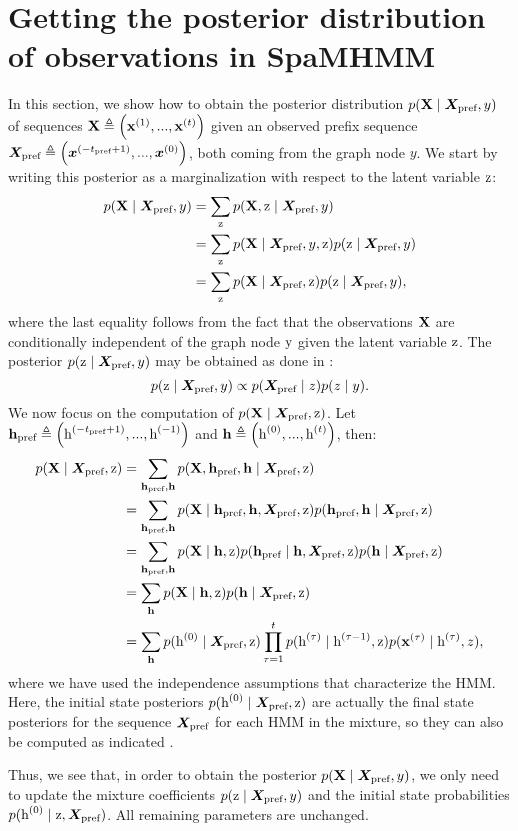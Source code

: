 \section{Getting the posterior distribution of observations in SpaMHMM}
\label{sec:posterior_proof}
In this section, we show how to obtain the posterior distribution $p({\mathbf{X}} \mid {\bm{X}}_\text{pref}, y)$ of sequences ${\mathbf{X}} \triangleq \left({\mathbf{x}}^{(1)}, ...,{\mathbf{x}}^{(t)}\right)$ given an observed prefix sequence ${\bm{X}}_\text{pref} \triangleq \left({\bm{x}}^{(-t_\text{pref}+1)}, ...,{\bm{x}}^{(0)}\right)$, both coming from the graph node $y$. We start by writing this posterior as a marginalization with respect to the latent variable ${\textnormal{z}}$:
\begin{align}
\label{mhmm_posterior}
p({\mathbf{X}} \mid {\bm{X}}_\text{pref}, y) &= \sum_{{\textnormal{z}}} p({\mathbf{X}}, {\textnormal{z}} \mid {\bm{X}}_\text{pref}, y)\nonumber\\
&= \sum_{{\textnormal{z}}} p({\mathbf{X}} \mid {\bm{X}}_\text{pref}, y, {\textnormal{z}}) p({\textnormal{z}} \mid {\bm{X}}_\text{pref}, y) \nonumber\\
&= \sum_{{\textnormal{z}}} p({\mathbf{X}} \mid {\bm{X}}_\text{pref}, {\textnormal{z}}) p({\textnormal{z}} \mid {\bm{X}}_\text{pref}, y),
\end{align}
where the last equality follows from the fact that the observations ${\mathbf{X}}$ are conditionally independent of the graph node ${\textnormal{y}}$ given the latent variable ${\textnormal{z}}$. The posterior $p({\textnormal{z}} \mid {\bm{X}}_\text{pref}, y)$ may be obtained as done in :
\begin{equation}
p({\textnormal{z}} \mid {\bm{X}}_\text{pref}, y) \propto p({\bm{X}}_\text{pref} \mid z)p(z \mid y).
\end{equation}
We now focus on the computation of $p({\mathbf{X}} \mid {\bm{X}}_\text{pref}, {\textnormal{z}})$. Let ${\mathbf{h}}_\text{pref} \triangleq \left({\textnormal{h}}^{(-t_\text{pref}+1)}, ...,{\textnormal{h}}^{(-1)}\right)$ and ${\mathbf{h}} \triangleq \left({\textnormal{h}}^{(0)}, ...,{\textnormal{h}}^{(t)}\right)$, then:
\begin{align}
p({\mathbf{X}} \mid {\bm{X}}_\text{pref}, {\textnormal{z}}) &= \sum_{{\mathbf{h}}_\text{pref}, {\mathbf{h}}} p({\mathbf{X}}, {\mathbf{h}}_\text{pref}, {\mathbf{h}} \mid {\bm{X}}_\text{pref}, {\textnormal{z}}) \nonumber\\
&= \sum_{{\mathbf{h}}_\text{pref}, {\mathbf{h}}} p({\mathbf{X}} \mid {\mathbf{h}}_\text{pref}, {\mathbf{h}}, {\bm{X}}_\text{pref}, {\textnormal{z}}) p({\mathbf{h}}_\text{pref}, {\mathbf{h}} \mid {\bm{X}}_\text{pref}, {\textnormal{z}}) \nonumber\\
&= \sum_{{\mathbf{h}}_\text{pref}, {\mathbf{h}}} p({\mathbf{X}} \mid {\mathbf{h}}, {\textnormal{z}}) p({\mathbf{h}}_\text{pref} \mid {\mathbf{h}}, {\bm{X}}_\text{pref}, {\textnormal{z}}) p({\mathbf{h}} \mid {\bm{X}}_\text{pref}, {\textnormal{z}}) \nonumber\\
&= \sum_{{\mathbf{h}}} p({\mathbf{X}} \mid {\mathbf{h}}, {\textnormal{z}}) p({\mathbf{h}} \mid {\bm{X}}_\text{pref}, {\textnormal{z}}) \nonumber\\
&= \sum_{{\mathbf{h}}} p({\textnormal{h}}^{(0)} \mid {\bm{X}}_\text{pref}, {\textnormal{z}}) \prod_{\tau=1}^{t} p({\textnormal{h}}^{(\tau)} \mid {\textnormal{h}}^{(\tau-1)}, {\textnormal{z}}) p({\mathbf{x}}^{(\tau)} \mid {\textnormal{h}}^{(\tau)}, z),
\end{align}
where we have used the independence assumptions that characterize the HMM. Here, the initial state posteriors $p({\textnormal{h}}^{(0)} \mid {\bm{X}}_\text{pref}, {\textnormal{z}})$ are actually the final state posteriors for the sequence ${\bm{X}}_\text{pref}$ for each HMM in the mixture, so they can also be computed as indicated .

Thus, we see that, in order to obtain the posterior $p({\mathbf{X}} \mid {\bm{X}}_\text{pref}, y)$, we only need to update the mixture coefficients $p({\textnormal{z}} \mid {\bm{X}}_\text{pref}, y)$ and the initial state probabilities $p({\textnormal{h}}^{(0)} \mid {\textnormal{z}}, {\bm{X}}_\text{pref})$. All remaining parameters are unchanged.